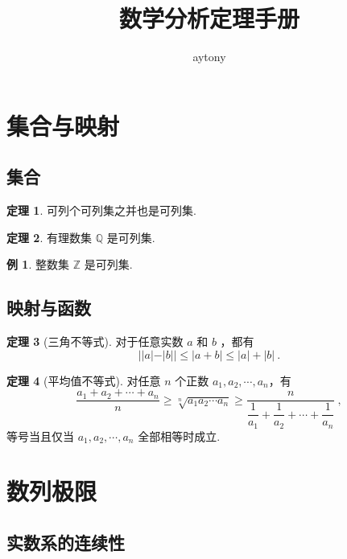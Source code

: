 \documentclass[zihao=-4,linespread=1.8,UTF8,nothm]{aytony_base}
\title{数学分析定理手册}
\author{aytony}
\theoremstyle{definition}
\newtheorem{theorem}{\indent\heiti\textbf{定理}}[subsection]
\newtheorem{example}{\indent\heiti\textbf{例}}[subsection]
\begin{document}
\maketitle
\tableofcontents
\newpage

\section{集合与映射}

\subsection{集合}

\begin{theorem}
    可列个可列集之并也是可列集.
\end{theorem}

\begin{theorem}
    有理数集 $\mathbb{Q}$ 是可列集.
\end{theorem}

\setcounter{example}{1}
\begin{example}
    整数集 $\mathbb{Z}$ 是可列集.
\end{example}

\subsection{映射与函数}

\begin{theorem}[三角不等式]
    对于任意实数 $a$ 和 $b$ ，都有 $$
        ||a| - |b|| \leqslant |a+b| \leqslant |a| + |b|\ .
    $$
\end{theorem}

\begin{theorem}[平均值不等式]
    对任意 $n$ 个正数 $a_1, a_2, \cdots, a_n$，有 $$
        \dfrac{a_1 + a_2 + \cdots + a_n}{n} \geqslant \sqrt[n]{a_1a_2\cdots a_n} \geqslant \dfrac{n}{\dfrac{1}{a_1} + \dfrac{1}{a_2} + \cdots + \dfrac{1}{a_n}}\ ,
    $$ 等号当且仅当 $a_1, a_2, \cdots, a_n$ 全部相等时成立.
\end{theorem}

\section{数列极限}

\subsection{实数系的连续性}
\end{document}
